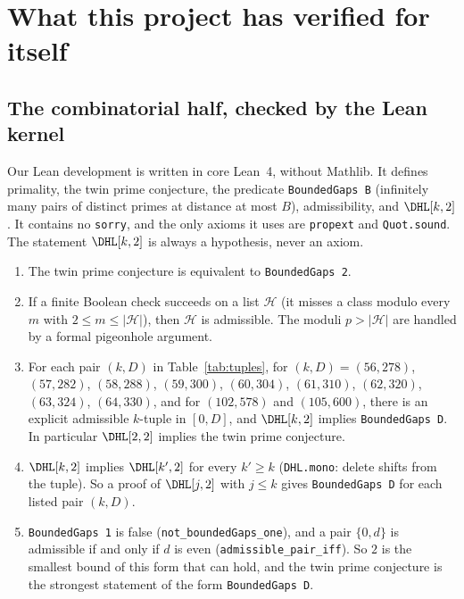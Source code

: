 \section{What this project has verified for itself}

\subsection{The combinatorial half, checked by the Lean kernel}

Our Lean development is written in core Lean~4, without Mathlib. It defines
primality, the twin prime conjecture, the predicate \texttt{BoundedGaps B}
(infinitely many pairs of distinct primes at distance at most $B$),
admissibility, and $\DHL[k,2]$. It contains no \texttt{sorry}, and the only
axioms it uses are \texttt{propext} and \texttt{Quot.sound}. The statement
$\DHL[k,2]$ is always a hypothesis, never an axiom.

\begin{theorem}\label{thm:lean}
\begin{enumerate}
\item The twin prime conjecture is equivalent to \texttt{BoundedGaps 2}.
\item If a finite Boolean check succeeds on a list $\mathcal H$ (it misses a
class modulo every $m$ with $2\le m\le|\mathcal H|$), then $\mathcal H$ is
admissible. The moduli $p>|\mathcal H|$ are handled by a formal pigeonhole
argument.
\item For each pair $(k,D)$ in Table~\ref{tab:tuples}, for
$(k,D)=(56,278)$, $(57,282)$, $(58,288)$, $(59,300)$, $(60,304)$, $(61,310)$,
$(62,320)$, $(63,324)$, $(64,330)$, and for $(102,578)$ and $(105,600)$, there is an explicit admissible $k$-tuple in $[0,D]$, and
$\DHL[k,2]$ implies \texttt{BoundedGaps D}. In particular $\DHL[2,2]$ implies
the twin prime conjecture.
\item $\DHL[k,2]$ implies $\DHL[k',2]$ for every $k'\ge k$
(\texttt{DHL.mono}: delete shifts from the tuple). So a proof of $\DHL[j,2]$
with $j\le k$ gives \texttt{BoundedGaps D} for each listed pair $(k,D)$.
\item \texttt{BoundedGaps 1} is false (\texttt{not\_boundedGaps\_one}), and a
pair $\{0,d\}$ is admissible if and only if $d$ is even
(\texttt{admissible\_pair\_iff}). So $2$ is the smallest bound of this form
that can hold, and the twin prime conjecture is the strongest statement of the
form \texttt{BoundedGaps D}.
\end{enumerate}
\end{theorem}

